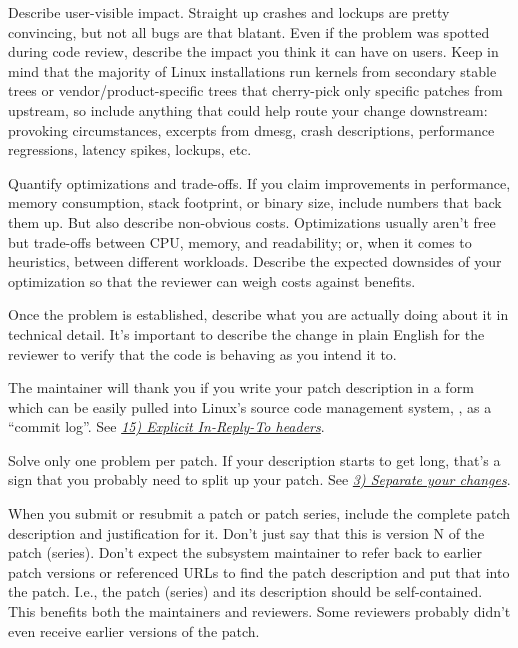 \documentclass[a4paper,8pt,english]{sphinxmanual}
\begin{document}
Describe user-visible impact.  Straight up crashes and lockups are
pretty convincing, but not all bugs are that blatant.  Even if the
problem was spotted during code review, describe the impact you think
it can have on users.  Keep in mind that the majority of Linux
installations run kernels from secondary stable trees or
vendor/product-specific trees that cherry-pick only specific patches
from upstream, so include anything that could help route your change
downstream: provoking circumstances, excerpts from dmesg, crash
descriptions, performance regressions, latency spikes, lockups, etc.

Quantify optimizations and trade-offs.  If you claim improvements in
performance, memory consumption, stack footprint, or binary size,
include numbers that back them up.  But also describe non-obvious
costs.  Optimizations usually aren't free but trade-offs between CPU,
memory, and readability; or, when it comes to heuristics, between
different workloads.  Describe the expected downsides of your
optimization so that the reviewer can weigh costs against benefits.

Once the problem is established, describe what you are actually doing
about it in technical detail.  It's important to describe the change
in plain English for the reviewer to verify that the code is behaving
as you intend it to.

The maintainer will thank you if you write your patch description in a
form which can be easily pulled into Linux's source code management
system, , as a ``commit log''.  See {\hyperref[process/submitting\string-patches:explicit\string-in\string-reply\string-to]{\emph{15) Explicit In-Reply-To headers}}}.

Solve only one problem per patch.  If your description starts to get
long, that's a sign that you probably need to split up your patch.
See {\hyperref[process/submitting\string-patches:split\string-changes]{\emph{3) Separate your changes}}}.

When you submit or resubmit a patch or patch series, include the
complete patch description and justification for it.  Don't just
say that this is version N of the patch (series).  Don't expect the
subsystem maintainer to refer back to earlier patch versions or referenced
URLs to find the patch description and put that into the patch.
I.e., the patch (series) and its description should be self-contained.
This benefits both the maintainers and reviewers.  Some reviewers
probably didn't even receive earlier versions of the patch.
\end{document}
